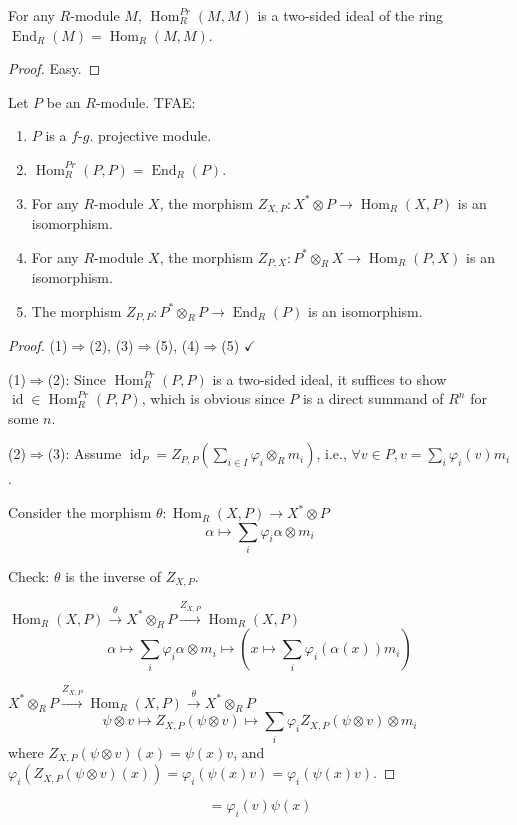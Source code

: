 \documentclass[11pt, a4paper]{report}
\begin{document}
\begin{lemma}
For any $R$-module $M$, $\operatorname{Hom}_{R}^{Pr}(M, M)$ is a two-sided ideal of the ring $\operatorname{End}_{R}(M)=\operatorname{Hom}_{R}(M, M)$.
\end{lemma}

\begin{proof}
Easy.
\end{proof}

\begin{theorem}
Let $P$ be an $R$-module. TFAE:
\begin{enumerate}
\item[(1)] $P$ is a $f\text{-}g$. projective module.
\item[(2)] $\operatorname{Hom}_{R}^{Pr}(P, P)=\operatorname{End}_{R}(P)$.
\item[(3)] For any $R$-module $X$, the morphism $Z_{X, P}\colon X^{*} \otimes P \rightarrow \operatorname{Hom}_{R}(X, P)$ is an isomorphism.
\item[(4)] For any $R$-module $X$, the morphism $Z_{P, X}\colon P^{*} \otimes_{R} X \rightarrow \operatorname{Hom}_{R}(P, X)$ is an isomorphism.
\item[(5)] The morphism $Z_{P, P}\colon P^{*} \otimes_{R} P \rightarrow \operatorname{End}_{R}(P)$ is an isomorphism.
\end{enumerate}
\end{theorem}

\begin{proof}
(1)$\Rightarrow$(2), (3)$\Rightarrow$(5), (4)$\Rightarrow$(5) $\checkmark$

(1)$\Rightarrow$(2): Since $\operatorname{Hom}_{R}^{Pr}(P, P)$ is a two-sided ideal, it suffices to show $\operatorname{id} \in \operatorname{Hom}_{R}^{Pr}(P, P)$, which is obvious since $P$ is a direct summand of $R^{n}$ for some $n$.

(2)$\Rightarrow$(3): Assume $\operatorname{id}_{P}=Z_{P, P}\left(\sum_{i \in I} \varphi_{i} \otimes_{R} m_{i}\right)$, i.e., $\forall v \in P, v=\sum_{i} \varphi_{i}(v) m_{i}$.

Consider the morphism $\theta\colon \operatorname{Hom}_{R}(X, P) \rightarrow X^{*} \otimes P$
\[
\alpha \mapsto \sum_{i} \varphi_{i} \alpha \otimes m_{i}
\]

Check: $\theta$ is the inverse of $Z_{X, P}$.

$\operatorname{Hom}_{R}(X, P) \xrightarrow{\theta} X^{*} \otimes_{R} P \xrightarrow{Z_{X, P}} \operatorname{Hom}_{R}(X, P)$
\[
\alpha \longmapsto \sum_{i} \varphi_{i} \alpha \otimes m_{i} \mapsto \left(x \mapsto \sum_{i} \varphi_{i}(\alpha(x)) m_{i}\right)
\]

$X^{*} \otimes_{R} P \xrightarrow{Z_{X, P}} \operatorname{Hom}_{R}(X, P) \xrightarrow{\theta} X^{*} \otimes_{R} P$
\[
\psi \otimes v \longmapsto Z_{X, P}(\psi \otimes v) \mapsto \sum_{i} \varphi_{i} Z_{X, P}(\psi \otimes v) \otimes m_{i}
\]
where $Z_{X, P}(\psi \otimes v)(x)=\psi(x) v$, and $\varphi_{i}(Z_{X, P}(\psi \otimes v)(x))=\varphi_{i}(\psi(x) v)=\varphi_{i}(\psi(x) v)$.
\end{proof}
\[
=\varphi_{i}(v) \psi(x)
\]
\end{document}
